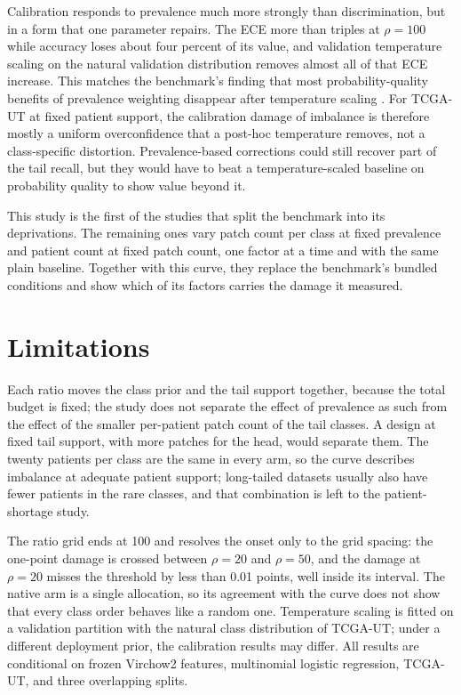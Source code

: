 Calibration responds to prevalence much more strongly than discrimination, but in a form that one parameter repairs. The ECE more than triples at $\rho=100$ while accuracy loses about four percent of its value, and validation temperature scaling on the natural validation distribution removes almost all of that ECE increase. This matches the benchmark's finding that most probability-quality benefits of prevalence weighting disappear after temperature scaling \citep{queisler2026benchmarkResults}. For TCGA-UT at fixed patient support, the calibration damage of imbalance is therefore mostly a uniform overconfidence that a post-hoc temperature removes, not a class-specific distortion. Prevalence-based corrections \citep{buda2018systematic} could still recover part of the tail recall, but they would have to beat a temperature-scaled baseline on probability quality to show value beyond it.

This study is the first of the studies that split the benchmark into its deprivations. The remaining ones vary patch count per class at fixed prevalence and patient count at fixed patch count, one factor at a time and with the same plain baseline. Together with this curve, they replace the benchmark's bundled conditions and show which of its factors carries the damage it measured.

\section{Limitations}
\label{sec:limitations}
Each ratio moves the class prior and the tail support together, because the total budget is fixed; the study does not separate the effect of prevalence as such from the effect of the smaller per-patient patch count of the tail classes. A design at fixed tail support, with more patches for the head, would separate them. The twenty patients per class are the same in every arm, so the curve describes imbalance at adequate patient support; long-tailed datasets usually also have fewer patients in the rare classes, and that combination is left to the patient-shortage study.

The ratio grid ends at 100 and resolves the onset only to the grid spacing: the one-point damage is crossed between $\rho=20$ and $\rho=50$, and the damage at $\rho=20$ misses the threshold by less than 0.01 points, well inside its interval. The native arm is a single allocation, so its agreement with the curve does not show that every class order behaves like a random one. Temperature scaling is fitted on a validation partition with the natural class distribution of TCGA-UT; under a different deployment prior, the calibration results may differ. All results are conditional on frozen Virchow2 features, multinomial logistic regression, TCGA-UT, and three overlapping splits.
